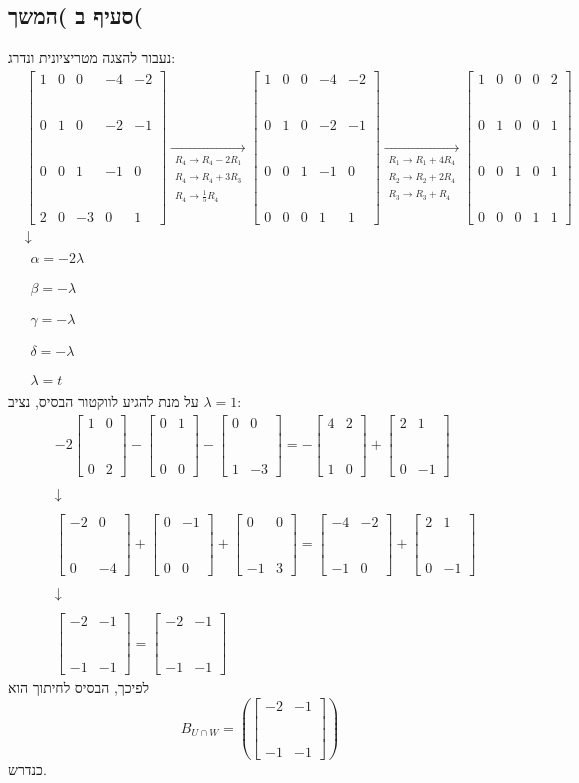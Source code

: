 \documentclass[11pt, oneside]{article}
\newcommand{\qed}{\R{$\blacksquare$}}
\newcommand{\br}{\\\\\\\\\\\\}
\newcommand{\opr}[1]{\xrightarrow[\text{#1}]{}}
\newcommand{\oprm}[1]{\underset{\substack{#1}}{\longrightarrow}}
\newcommand{\tot}[4]{\begin{bmatrix}#1 & #2\br#3 & #4\end{bmatrix}}
\begin{document}
\subsection{סעיף ב )המשך(}
נעבור להצגה מטריציונית ונדרג:
\begin{eqnarray*}
& \begin{bmatrix}
1 & 0 & 0 & -4 & -2\br
0 & 1 & 0 & -2 & -1\br
0 & 0 & 1 & -1 & 0\br
2 & 0 & -3 & 0 & 1
\end{bmatrix}
\oprm{%
R_4 \opr{} R_4 - 2R_1\\
R_4 \opr{} R_4 + 3R_3\\
R_4 \opr{} \frac{1}{5}R_4
}
\begin{bmatrix}
1 & 0 & 0 & -4 & -2\br
0 & 1 & 0 & -2 & -1\br
0 & 0 & 1 & -1 & 0\br
0 & 0 & 0 & 1 & 1
\end{bmatrix}
\oprm{%
R_1 \opr{} R_1 + 4R_4\\
R_2 \opr{} R_2 + 2R_4\\
R_3 \opr{} R_3 + R_4
}
\begin{bmatrix}
1 & 0 & 0 & 0 & 2\br
0 & 1 & 0 & 0 & 1\br
0 & 0 & 1 & 0 & 1\br
0 & 0 & 0 & 1 & 1
\end{bmatrix}\\
& \downarrow\\
& \begin{matrix}
\alpha = -2\lambda\\\\\\
\beta = -\lambda\\\\\\
\gamma = -\lambda\\\\\\
\delta = -\lambda\\\\\\
\lambda = t
\end{matrix}
\end{eqnarray*}
על מנת להגיע לווקטור הבסיס, נציב $\lambda = 1$:
\begin{eqnarray*}
& -2\tot{1}{0}{0}{2} - \tot{0}{1}{0}{0} - \tot{0}{0}{1}{-3} = -\tot{4}{2}{1}{0} + \tot{2}{1}{0}{-1}\\\\
& \downarrow\\\\
& \tot{-2}{0}{0}{-4} + \tot{0}{-1}{0}{0} + \tot{0}{0}{-1}{3} = \tot{-4}{-2}{-1}{0} + \tot{2}{1}{0}{-1}\\\\
& \downarrow\\\\
& \tot{-2}{-1}{-1}{-1} = \tot{-2}{-1}{-1}{-1}
\end{eqnarray*}
לפיכך, הבסיס לחיתוך הוא
$$B_{U \cap W} = \left(\tot{-2}{-1}{-1}{-1}\right)$$
כנדרש.
\br\qed
\end{document}
